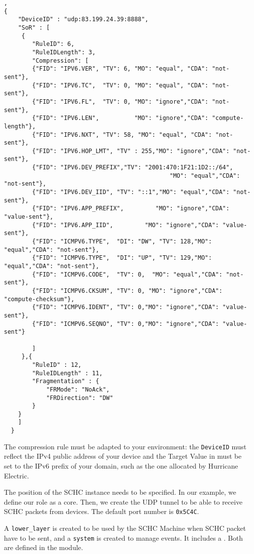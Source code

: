 \begin{lstlisting}[caption={rule icmp1.json}, backgroundcolor=\color{yellow}, label=rule-icmp1, basicstyle=\ttfamily\tiny],
{
    "DeviceID" : "udp:83.199.24.39:8888",
    "SoR" : [
	 {
	    "RuleID": 6,
	    "RuleIDLength": 3,
	    "Compression": [
		{"FID": "IPV6.VER", "TV": 6, "MO": "equal", "CDA": "not-sent"},
		{"FID": "IPV6.TC",  "TV": 0, "MO": "equal", "CDA": "not-sent"},
		{"FID": "IPV6.FL",  "TV": 0, "MO": "ignore","CDA": "not-sent"},
		{"FID": "IPV6.LEN",          "MO": "ignore","CDA": "compute-length"},
		{"FID": "IPV6.NXT", "TV": 58, "MO": "equal", "CDA": "not-sent"},
		{"FID": "IPV6.HOP_LMT", "TV" : 255,"MO": "ignore","CDA": "not-sent"},
		{"FID": "IPV6.DEV_PREFIX","TV": "2001:470:1F21:1D2::/64",
                                               "MO": "equal","CDA": "not-sent"},
		{"FID": "IPV6.DEV_IID", "TV": "::1","MO": "equal","CDA": "not-sent"},
		{"FID": "IPV6.APP_PREFIX",         "MO": "ignore","CDA": "value-sent"},
		{"FID": "IPV6.APP_IID",         "MO": "ignore","CDA": "value-sent"},
		{"FID": "ICMPV6.TYPE",  "DI": "DW", "TV": 128,"MO": "equal","CDA": "not-sent"},
		{"FID": "ICMPV6.TYPE",  "DI": "UP", "TV": 129,"MO": "equal","CDA": "not-sent"},
		{"FID": "ICMPV6.CODE",  "TV": 0,  "MO": "equal","CDA": "not-sent"},
		{"FID": "ICMPV6.CKSUM", "TV": 0, "MO": "ignore","CDA": "compute-checksum"},
		{"FID": "ICMPV6.IDENT", "TV": 0,"MO": "ignore","CDA": "value-sent"},
		{"FID": "ICMPV6.SEQNO", "TV": 0,"MO": "ignore","CDA": "value-sent"}
		
	    ]
	 },{
		"RuleID" : 12,
		"RuleIDLength" : 11,
		"Fragmentation" : {
			"FRMode": "NoAck",
			"FRDirection": "DW"
		}
	} 
    ]
  }
\end{lstlisting}

The compression rule must be adapted to your environment: the \texttt{DeviceID} must reflect the IPv4 public address of your device and the Target Value in  must be set to the IPv6 prefix of your domain, such as the one allocated by Hurricane Electric.


The position of the SCHC instance needs to be specified. In our example, we define our role as a core. Then, we create the UDP tunnel to be able to receive SCHC packets from devices. The default port number is \texttt{0x5C4C}.

A \texttt{lower\_layer} is created to be used by the SCHC Machine when SCHC packet have to be sent, and a \texttt{system} is created to manage events. It includes a . Both are defined in the  module. 


